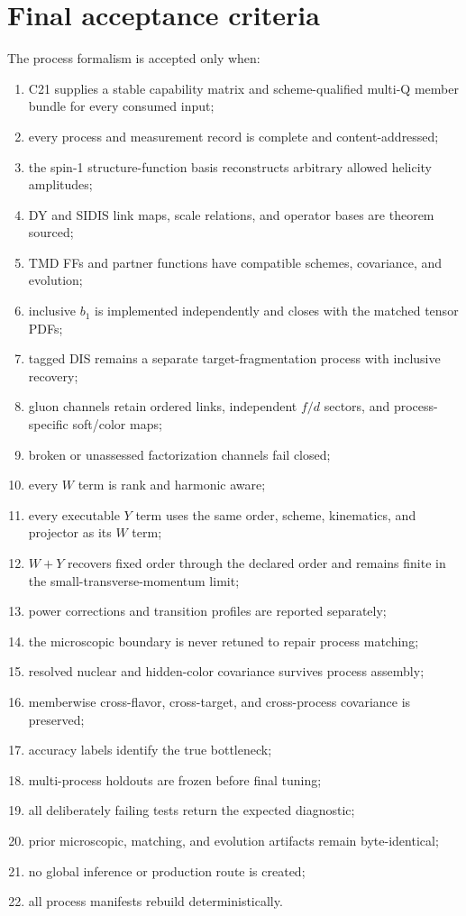\documentclass[11pt]{article}
\begin{document}
\section{Final acceptance criteria}
\label{sec:acceptance}

The process formalism is accepted only when:
\begin{enumerate}
\item C21 supplies a stable capability matrix and scheme-qualified multi-Q member bundle for every consumed input;
\item every process and measurement record is complete and content-addressed;
\item the spin-1 structure-function basis reconstructs arbitrary allowed helicity amplitudes;
\item DY and SIDIS link maps, scale relations, and operator bases are theorem sourced;
\item TMD FFs and partner functions have compatible schemes, covariance, and evolution;
\item inclusive \(b_1\) is implemented independently and closes with the matched tensor PDFs;
\item tagged DIS remains a separate target-fragmentation process with inclusive recovery;
\item gluon channels retain ordered links, independent \(f/d\) sectors, and process-specific soft/color maps;
\item broken or unassessed factorization channels fail closed;
\item every \(W\) term is rank and harmonic aware;
\item every executable \(Y\) term uses the same order, scheme, kinematics, and projector as its \(W\) term;
\item \(W+Y\) recovers fixed order through the declared order and remains finite in the small-transverse-momentum limit;
\item power corrections and transition profiles are reported separately;
\item the microscopic boundary is never retuned to repair process matching;
\item resolved nuclear and hidden-color covariance survives process assembly;
\item memberwise cross-flavor, cross-target, and cross-process covariance is preserved;
\item accuracy labels identify the true bottleneck;
\item multi-process holdouts are frozen before final tuning;
\item all deliberately failing tests return the expected diagnostic;
\item prior microscopic, matching, and evolution artifacts remain byte-identical;
\item no global inference or production route is created;
\item all process manifests rebuild deterministically.
\end{enumerate}
\end{document}
